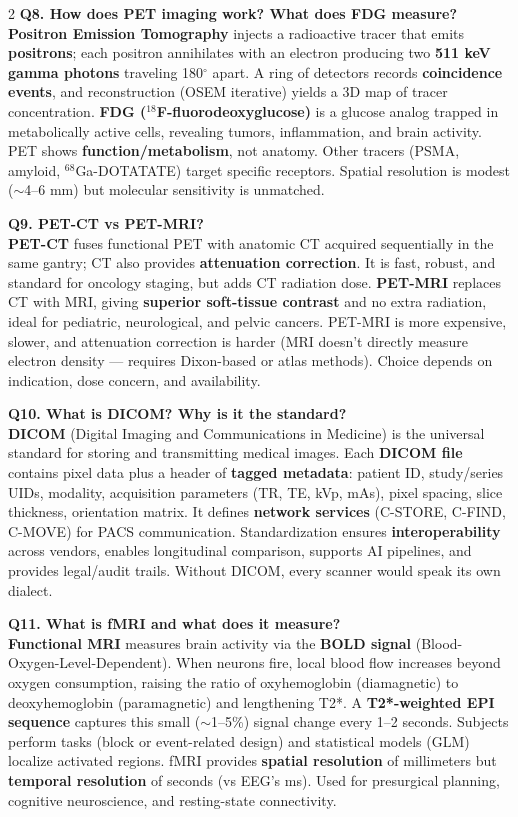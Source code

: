 \begin{paracol}{2}
\textbf{Q8. How does PET imaging work? What does FDG measure?}\\
\textbf{Positron Emission Tomography} injects a radioactive tracer that emits \textbf{positrons}; each positron annihilates with an electron producing two \textbf{511 keV gamma photons} traveling 180$^\circ$ apart. A ring of detectors records \textbf{coincidence events}, and reconstruction (OSEM iterative) yields a 3D map of tracer concentration. \textbf{FDG ($^{18}$F-fluorodeoxyglucose)} is a glucose analog trapped in metabolically active cells, revealing tumors, inflammation, and brain activity. PET shows \textbf{function/metabolism}, not anatomy. Other tracers (PSMA, amyloid, $^{68}$Ga-DOTATATE) target specific receptors. Spatial resolution is modest ($\sim$4--6 mm) but molecular sensitivity is unmatched.

\textbf{Q9. PET-CT vs PET-MRI?}\\
\textbf{PET-CT} fuses functional PET with anatomic CT acquired sequentially in the same gantry; CT also provides \textbf{attenuation correction}. It is fast, robust, and standard for oncology staging, but adds CT radiation dose. \textbf{PET-MRI} replaces CT with MRI, giving \textbf{superior soft-tissue contrast} and no extra radiation, ideal for pediatric, neurological, and pelvic cancers. PET-MRI is more expensive, slower, and attenuation correction is harder (MRI doesn't directly measure electron density --- requires Dixon-based or atlas methods). Choice depends on indication, dose concern, and availability.

\textbf{Q10. What is DICOM? Why is it the standard?}\\
\textbf{DICOM} (Digital Imaging and Communications in Medicine) is the universal standard for storing and transmitting medical images. Each \textbf{DICOM file} contains pixel data plus a header of \textbf{tagged metadata}: patient ID, study/series UIDs, modality, acquisition parameters (TR, TE, kVp, mAs), pixel spacing, slice thickness, orientation matrix. It defines \textbf{network services} (C-STORE, C-FIND, C-MOVE) for PACS communication. Standardization ensures \textbf{interoperability} across vendors, enables longitudinal comparison, supports AI pipelines, and provides legal/audit trails. Without DICOM, every scanner would speak its own dialect.

\textbf{Q11. What is fMRI and what does it measure?}\\
\textbf{Functional MRI} measures brain activity via the \textbf{BOLD signal} (Blood-Oxygen-Level-Dependent). When neurons fire, local blood flow increases beyond oxygen consumption, raising the ratio of oxyhemoglobin (diamagnetic) to deoxyhemoglobin (paramagnetic) and lengthening T2*. A \textbf{T2*-weighted EPI sequence} captures this small ($\sim$1--5\%) signal change every 1--2 seconds. Subjects perform tasks (block or event-related design) and statistical models (GLM) localize activated regions. fMRI provides \textbf{spatial resolution} of millimeters but \textbf{temporal resolution} of seconds (vs EEG's ms). Used for presurgical planning, cognitive neuroscience, and resting-state connectivity.


\end{paracol}
